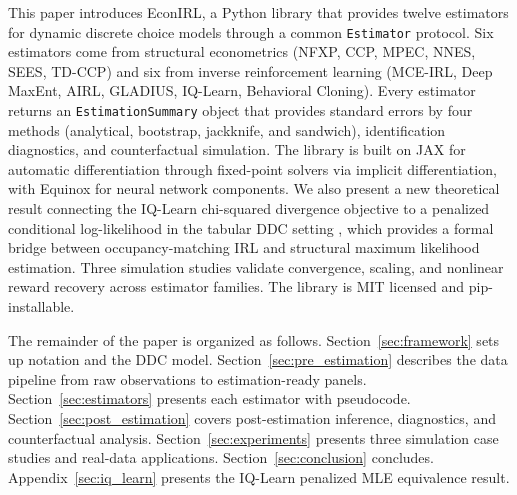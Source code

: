 This paper introduces EconIRL, a Python library that provides twelve estimators for dynamic discrete choice models through a common \texttt{Estimator} protocol. Six estimators come from structural econometrics (NFXP, CCP, MPEC, NNES, SEES, TD-CCP) and six from inverse reinforcement learning (MCE-IRL, Deep MaxEnt, AIRL, GLADIUS, IQ-Learn, Behavioral Cloning). Every estimator returns an \texttt{EstimationSummary} object that provides standard errors by four methods (analytical, bootstrap, jackknife, and sandwich), identification diagnostics, and counterfactual simulation. The library is built on JAX \citep{jax2018} for automatic differentiation through fixed-point solvers via implicit differentiation, with Equinox \citep{kidger2021} for neural network components. We also present a new theoretical result connecting the IQ-Learn chi-squared divergence objective to a penalized conditional log-likelihood in the tabular DDC setting \citep{rawat2026}, which provides a formal bridge between occupancy-matching IRL and structural maximum likelihood estimation. Three simulation studies validate convergence, scaling, and nonlinear reward recovery across estimator families. The library is MIT licensed and pip-installable.

The remainder of the paper is organized as follows. Section~\ref{sec:framework} sets up notation and the DDC model. Section~\ref{sec:pre_estimation} describes the data pipeline from raw observations to estimation-ready panels. Section~\ref{sec:estimators} presents each estimator with pseudocode. Section~\ref{sec:post_estimation} covers post-estimation inference, diagnostics, and counterfactual analysis. Section~\ref{sec:experiments} presents three simulation case studies and real-data applications. Section~\ref{sec:conclusion} concludes. Appendix~\ref{sec:iq_learn} presents the IQ-Learn penalized MLE equivalence result.
